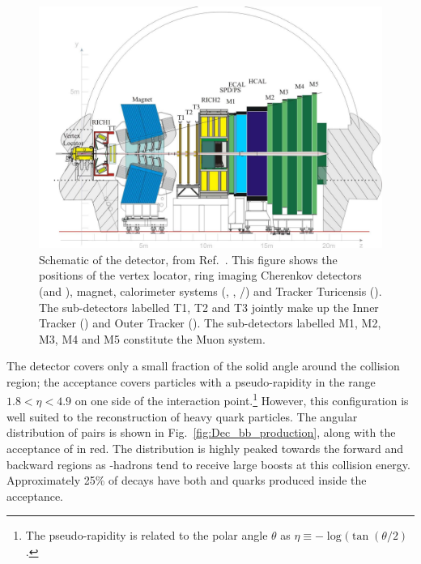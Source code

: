 \begin{figure}[!h]
    \centering
    \includegraphics[width=1.0\textwidth]{figs/Detector/LHCb_Detector_Schematic.pdf}
    \caption{Schematic of the \lhcb detector, from Ref.~\cite{Alves:2008zz}. This figure shows the positions of the vertex locator, ring imaging Cherenkov detectors (\richone and \richtwo), magnet, calorimeter systems (\ecal, \hcal, \spd/\presh) and Tracker Turicensis (\ttracker). The sub-detectors labelled T1, T2 and T3 jointly make up the Inner Tracker (\intr) and Outer Tracker (\ot). The sub-detectors labelled M1, M2, M3, M4 and M5 constitute the Muon system.  }
    \label{fig:Dec_lhcb_Schematic}   
\end{figure}

The \lhcb detector covers only a small fraction of the solid angle around the collision region; the acceptance covers particles with a pseudo-rapidity in the range $1.8 < \eta < 4.9$ on one side of the interaction point.\footnote{The pseudo-rapidity is related to the polar angle $\theta$ as $\eta\equiv-\log(\tan{(\theta/2)}$.} However, this configuration is well suited to the reconstruction of heavy quark particles. The angular distribution of \bquark\bquarkbar pairs is shown in Fig.~\ref{fig:Dec_bb_production}, along with the acceptance of \lhcb in red. The distribution is highly peaked towards the forward and backward regions as \bquark-hadrons tend to receive large boosts at this collision energy. Approximately 25\% of decays have both \bquark and \bquarkbar quarks produced inside the acceptance.

